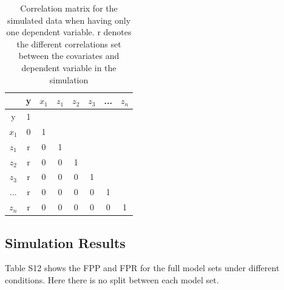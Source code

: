 \begin{table}[H]
\caption{}
\centering
\caption*{Correlation matrix for the simulated data when having only one dependent variable. r denotes the different correlations set between the covariates and dependent variable in the simulation}
\begin{tabular}{c|ccccccc} 
\toprule
 & y & $x_1$ & $z_1$ & $z_2$ & $z_3$ & ... & $z_n$ \\ 
 \midrule
y & 1 &  &  &  &  &  &  \\ 
$x_1$ & 0 & 1 &  &  &  &  &  \\ 
$z_1$ & r & 0 & 1 &  &  &  &  \\  
$z_2$ & r & 0 & 0 & 1 &  &  &  \\  
$z_3$ & r & 0 & 0 & 0 & 1 &  &  \\  
... & r & 0 & 0 & 0 & 0 & 1 &  \\ 
$z_n$ & r & 0 & 0 & 0 & 0 & 0 & 1 \\ 
\bottomrule
\end{tabular}
\end{table}

\subsection{Simulation Results}
Table S12 shows the FPP and FPR for the full model sets under different conditions. Here there is no split between each model set.






